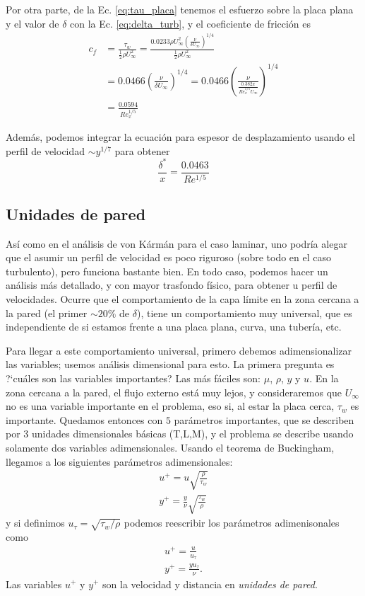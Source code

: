 Por otra parte, de la Ec. \eqref{eq:tau_placa} tenemos el esfuerzo sobre la placa plana y el valor de $\delta$ con la Ec. \eqref{eq:delta_turb}, y el coeficiente de fricción es
%
\begin{align}
c_f &= \frac{\tau_w}{\frac{1}{2}\rho U_\infty^2} = \frac{0.0233\rho U_\infty^2\left(\frac{\nu}{\delta U_\infty}\right)^{1/4}}{\frac{1}{2}\rho U_\infty^2 }\nonumber\\
    &= 0.0466\left(\frac{\nu}{\delta U_\infty}\right)^{1/4} = 0.0466\left(\frac{\nu}{\frac{0.382x}{Re_x^{1/5} U_\infty}}\right)^{1/4} \nonumber\\
    &= \frac{0.0594}{Re_x^{1/5}}
\end{align}

Además, podemos integrar la ecuación para espesor de desplazamiento usando el perfil de velocidad $\sim y^{1/7}$ para obtener
%
\begin{equation}
\frac{\delta^*}{x}=\frac{0.0463}{Re^{1/5}} 
\end{equation}

\subsection*{Unidades de pared}

Así como en el análisis de von Kármán para el caso laminar, uno podría alegar que el asumir un perfil de velocidad es poco riguroso (sobre todo en el caso turbulento), pero funciona bastante bien.
En todo caso, podemos hacer un análisis más detallado, y con mayor trasfondo físico, para obtener u perfil de velocidades.
Ocurre que el comportamiento de la capa límite en la zona cercana a la pared (el primer $\sim20\%$ de $\delta$), tiene un comportamiento muy universal, que es independiente de si estamos frente a una placa plana, curva, una tubería, etc.

Para llegar a este comportamiento universal, primero debemos adimensionalizar las variables; usemos análisis dimensional para esto.
La primera pregunta es \mbox{?`}cuáles son las variables importantes? Las más fáciles son: $\mu$, $\rho$, $y$ y $u$.
En la zona cercana a la pared, el flujo externo está muy lejos, y consideraremos que $U_\infty$ no es una variable importante en el problema, eso si, al estar la placa cerca, $\tau_w$ es importante.
Quedamos entonces con $5$ parámetros importantes, que se describen por $3$ unidades dimensionales básicas (T,L,M), y el problema se describe usando solamente dos variables adimensionales.
Usando el teorema de Buckingham, llegamos a los siguientes parámetros adimensionales:
%
\begin{align}
u^+ = u\sqrt{\frac{\rho}{\tau_w}}\nonumber\\
y^+ = \frac{y}{\nu}\sqrt{\frac{\tau_w}{\rho}}
\end{align}
%
y si definimos $u_\tau=\sqrt{\tau_w/\rho}$ podemos reescribir los parámetros adimenisonales como
%
\begin{align}\label{eq:unidades_pared}
u^+=\frac{u}{u_\tau}\nonumber\\
y^+=\frac{yu_\tau}{\nu}.
\end{align}
%
Las variables $u^+$ y $y^+$ son la velocidad y distancia en \emph{unidades de pared}.

